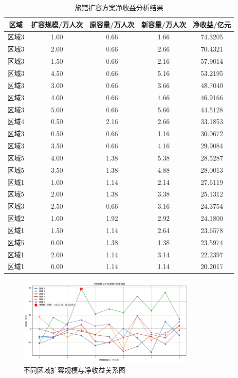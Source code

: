\begin{table}[htbp]\small
  \centering
  \caption{旅馆扩容方案净收益分析结果}
  \label{tab:expansion-results}
  \begin{tabularx}{\textwidth}{c c c c c}
    \toprule
    \textbf{区域} & \textbf{扩容规模/万人次} & \textbf{原容量/万人次} & \textbf{新容量/万人次} & \textbf{净收益/亿元} \\
    \midrule
    区域3 & 1.00 & 0.66 & 1.66 & 74.3205 \\
    区域3 & 2.00 & 0.66 & 2.66 & 70.4321 \\
    区域3 & 1.50 & 0.66 & 2.16 & 57.9014 \\
    区域3 & 4.50 & 0.66 & 5.16 & 53.2195 \\
    区域3 & 3.00 & 0.66 & 3.66 & 48.7040 \\
    区域3 & 4.00 & 0.66 & 4.66 & 46.9166 \\
    区域3 & 5.00 & 0.66 & 5.66 & 44.5128 \\
    区域4 & 0.50 & 2.16 & 2.66 & 33.1853 \\
    区域3 & 0.50 & 0.66 & 1.16 & 30.0672 \\
    区域3 & 3.50 & 0.66 & 4.16 & 29.9084 \\
    区域5 & 4.00 & 1.38 & 5.38 & 28.5287 \\
    区域5 & 3.50 & 1.38 & 4.88 & 28.0013 \\
    区域1 & 1.00 & 1.14 & 2.14 & 27.6119 \\
    区域5 & 2.00 & 1.38 & 3.38 & 25.1312 \\
    区域3 & 2.50 & 0.66 & 3.16 & 24.3754 \\
    区域2 & 1.00 & 1.92 & 2.92 & 24.1800 \\
    区域1 & 1.50 & 1.14 & 2.64 & 23.6578 \\
    区域5 & 0.00 & 1.38 & 1.38 & 23.5974 \\
    区域1 & 2.00 & 1.14 & 3.14 & 22.2397 \\
    区域1 & 0.00 & 1.14 & 1.14 & 20.2017 \\
    \bottomrule
  \end{tabularx}
\end{table}
\begin{figure}[htbp]
  \centering
  \includegraphics[width=0.8\textwidth]{figures/net_benefit_vs_expansion.png}
  \caption{不同区域扩容规模与净收益关系图}
  \label{fig:net-benefit-expansion}
\end{figure}



